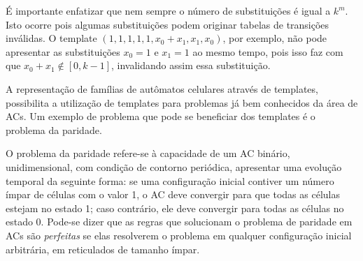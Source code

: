 \documentclass[12pt,a4paper]{article}
\begin{document}
É importante enfatizar que nem sempre o número de substituições é igual a $k^m$. Isto ocorre pois algumas substituições podem originar tabelas de transições inválidas. O template $(1,1,1,1,1,x_0+x_1,x_1,x_0)$, por exemplo, não pode apresentar as substituições $x_0=1$ e $x_1=1$ ao mesmo tempo, pois isso faz com que $x_0 + x_1 \notin [0, k-1]$, invalidando assim essa substituição.




A representação de famílias de autômatos celulares através de templates, possibilita a utilização de templates para problemas já bem conhecidos da área de ACs. Um exemplo de problema que pode se beneficiar dos templates é o problema da paridade.

O problema da paridade refere-se à capacidade de um AC binário, unidimensional, com condição de contorno periódica, apresentar uma evolução temporal da seguinte forma: se uma configuração inicial contiver um número ímpar de células com o valor 1, o AC deve convergir para que todas as células estejam no estado 1; caso contrário, ele deve convergir para todas as células no estado 0. Pode-se dizer que as regras que solucionam o problema de paridade em ACs são \textit{perfeitas} se elas resolverem o problema em qualquer configuração inicial arbitrária, em reticulados de tamanho ímpar. 
\end{document}
